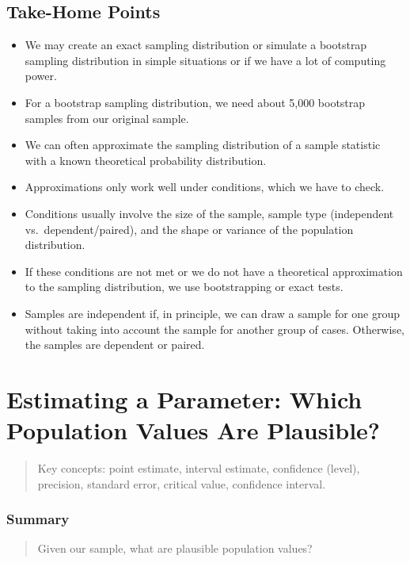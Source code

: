 \documentclass[a4paper]{book}
\theoremstyle{definition}
\theoremstyle{definition}
\theoremstyle{definition}
\theoremstyle{remark}
\begin{document}
\section{Take-Home Points}\label{take-home-points-1}

\begin{itemize}
\item
  We may create an exact sampling distribution or simulate a bootstrap
  sampling distribution in simple situations or if we have a lot of
  computing power.
\item
  For a bootstrap sampling distribution, we need about 5,000 bootstrap
  samples from our original sample.
\item
  We can often approximate the sampling distribution of a sample
  statistic with a known theoretical probability distribution.
\item
  Approximations only work well under conditions, which we have to
  check.
\item
  Conditions usually involve the size of the sample, sample type
  (independent vs.~dependent/paired), and the shape or variance of the
  population distribution.
\item
  If these conditions are not met or we do not have a theoretical
  approximation to the sampling distribution, we use bootstrapping or
  exact tests.
\item
  Samples are independent if, in principle, we can draw a sample for one
  group without taking into account the sample for another group of
  cases. Otherwise, the samples are dependent or paired.
\end{itemize}

\chapter{Estimating a Parameter: Which Population Values Are
Plausible?}\label{param-estim}

\begin{quote}
Key concepts: point estimate, interval estimate, confidence (level),
precision, standard error, critical value, confidence interval.
\end{quote}

\subsection*{Summary}\label{summary-2}

\begin{quote}
Given our sample, what are plausible population values?
\end{quote}
\end{document}
